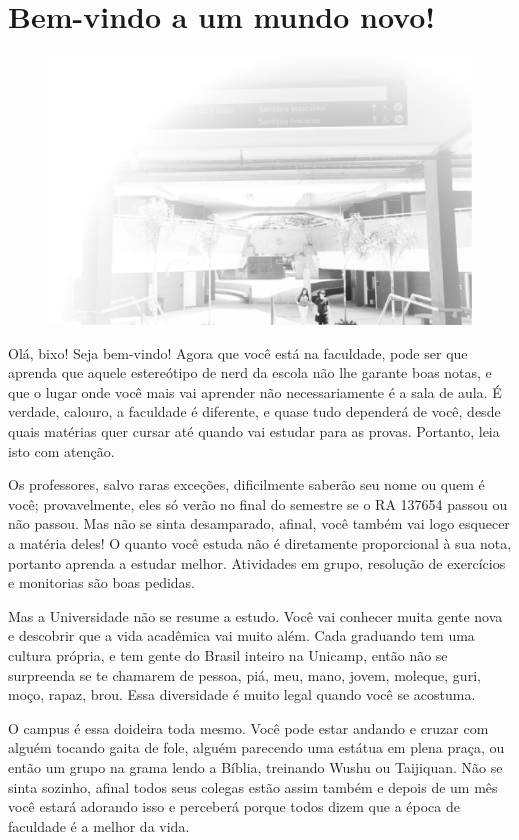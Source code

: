
\section{Bem-vindo a um mundo novo!}

\begin{figure}
    \includegraphics[width=.5\textwidth]{img/ola_mundo/cb.jpg}
\end{figure}

Olá, bixo! Seja bem-vindo! Agora que você está na faculdade, pode ser que
aprenda que aquele estereótipo de nerd da escola não lhe garante boas notas, e
que o lugar onde você mais vai aprender não necessariamente é a sala de aula. É
verdade, calouro, a faculdade é diferente, e quase tudo dependerá de você, desde
quais matérias quer cursar até quando vai estudar para as provas. Portanto, leia
isto com atenção.

Os professores, salvo raras exceções, dificilmente saberão seu nome ou quem é
você; provavelmente, eles só verão no final do semestre se o RA 137654  passou
ou não passou. Mas não se sinta desamparado, afinal, você também vai logo
esquecer a matéria deles! O quanto você estuda não é diretamente proporcional à
sua nota, portanto aprenda a estudar melhor. Atividades em grupo, resolução de
exercícios e monitorias são boas pedidas.

Mas a Universidade não se resume a estudo. Você vai conhecer muita gente nova e
descobrir que a vida acadêmica vai muito além.  Cada graduando tem uma cultura
própria, e tem gente do Brasil inteiro na Unicamp, então não se surpreenda se te
chamarem de pessoa, piá, meu, mano, jovem, moleque, guri, moço, rapaz, brou.
Essa diversidade é muito legal quando você se acostuma.

O campus é essa doideira toda mesmo. Você pode estar andando e cruzar com alguém
tocando gaita de fole, alguém parecendo uma estátua em plena praça, ou então um
grupo na grama lendo a Bíblia, treinando Wushu ou Taijiquan. Não se sinta
sozinho, afinal todos seus colegas estão assim também e depois de um mês você
estará adorando isso e perceberá porque todos dizem que a época de faculdade é a
melhor da vida.

